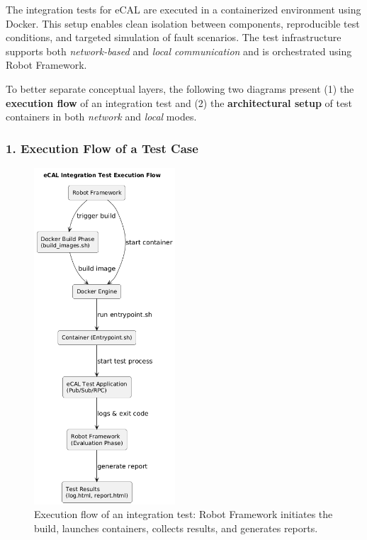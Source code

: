The integration tests for eCAL are executed in a containerized environment using Docker. This setup enables clean isolation between components, reproducible test conditions, and targeted simulation of fault scenarios. The test infrastructure supports both \textit{network-based} and \textit{local communication} and is orchestrated using Robot Framework. 

\vspace{1em}
To better separate conceptual layers, the following two diagrams present (1) the \textbf{execution flow} of an integration test and (2) the \textbf{architectural setup} of test containers in both \textit{network} and \textit{local} modes.

\vspace{1em}
\subsubsection*{1. Execution Flow of a Test Case}

\begin{figure}[H]
	\centering
	\includegraphics[width=0.47\textwidth]{Images/test_execution_flow.png}
	\caption{Execution flow of an integration test: Robot Framework initiates the build, launches containers, collects results, and generates reports.}
	\label{fig:ecal_test_execution_flow}
\end{figure}

